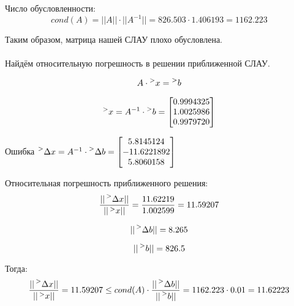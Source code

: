 \documentclass[14pt,a4paper]{scrartcl}
\begin{document}
Число обусловленности:
\begin{equation*}
	cond(A) = ||A|| \cdot ||A^{-1}|| = 826.503 \cdot 1.406193 = 1162.223
\end{equation*} 

Таким образом, матрица нашей СЛАУ плохо обусловлена. \\\\
Найдём относительную погрешность в решении приближенной СЛАУ.

\begin{equation*}
	A \cdot \prescript{>}{}{x} = \prescript{>}{}{b}
\end{equation*}

\begin{equation*}
	\prescript{>}{}{x} = A^{-1} \cdot \prescript{>}{}{b} = \begin{bmatrix}{}
	0.9994325 \\ 
	1.0025986 \\ 
	0.9979720 \\ 
	\end{bmatrix}
\end{equation*}

Ошибка $\prescript{>}{}{\Delta x} = A^{-1} \cdot \prescript{>}{}{\Delta b} = \begin{bmatrix}{}
5.8145124 \\ 
-11.6221892 \\ 
5.8060158 \\ 
\end{bmatrix} $

Относительная погрешность приближенного решения:
\begin{equation*}
	\frac{||\prescript{>}{}{\Delta x}||}{||\prescript{>}{}{x}||} = \frac{11.62219}{1.002599} = 11.59207
\end{equation*}

\begin{equation*}
	||\prescript{>}{}{\Delta b}|| = 8.265 
\end{equation*}

\begin{equation*}
	||\prescript{>}{}{b}|| = 826.5
\end{equation*}

Тогда:
\begin{equation*}
	\frac{||\prescript{>}{}{\Delta x}||}{||\prescript{>}{}{x}||} = 11.59207 \leq cond(A) \cdot \frac{||\prescript{>}{}{\Delta b}||}{||\prescript{>}{}{b}||} = 1162.223 \cdot 0.01 = 11.62223
\end{equation*}
\end{document}
